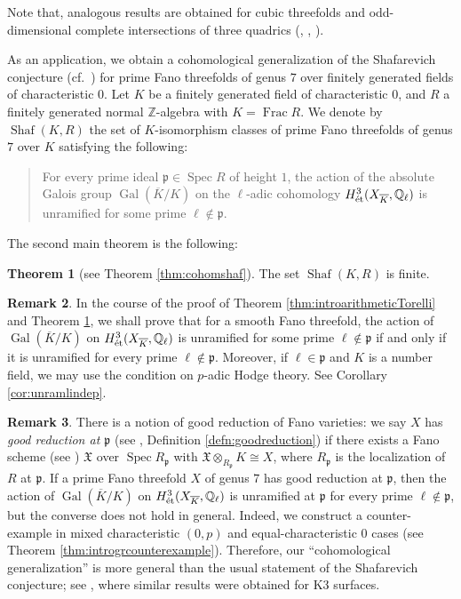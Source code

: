 \documentclass[autodetect-engine, a4paper]{amsart}
\theoremstyle{definition}
\newtheorem{thm}{Theorem}[section]
\newtheorem{rem}[thm]{Remark}
\def\p{{\mathfrak p}}
\def\Q{{\mathbb Q}}
\def\Z{{\mathbb Z}}
\DeclareMathOperator\Gal{\mathrm{Gal}}
\DeclareMathOperator\Frac{\mathrm{Frac}}
\DeclareMathOperator\Spec{\mathrm{Spec}}
\DeclareMathOperator\Shaf{\mathrm{Shaf}}
\def\et{\mathop{\text{\rm \'et}}}
\begin{document}
Note that, analogous results are obtained for cubic threefolds and odd-dimensional complete intersections of three quadrics (\cite{Achter}, \cite{ciurca2024prymvarietiescubicthreefolds}, \cite{Javanpeykar-Loughran:completeintersection}).

As an application, we obtain a cohomological generalization of the Shafarevich conjecture (cf.\ \cite{Takamatsu}) for prime Fano threefolds of genus $7$ over finitely generated fields of characteristic $0$.
Let $K$ be a finitely generated field of characteristic $0$,
and $R$ a finitely generated normal $\Z$-algebra
with $K = \Frac R$.
We denote by $\Shaf(K,R)$ the set of $K$-isomorphism classes of prime Fano threefolds of genus $7$ over $K$
satisfying the following:
\begin{quote}
For every prime ideal $\p \in \Spec R$ of height $1$,
the action of the absolute Galois group
$\Gal(\overline{K}/K)$ on the $\ell$-adic cohomology $H^3_{\et}(X_{\overline{K}}, \Q_{\ell})$
is unramified for some prime $\ell \notin \p$.
\end{quote}

The second main theorem is the following:

\begin{thm}[see Theorem \ref{thm:cohomshaf}]
\label{introMainTheoremshaf}
The set $\Shaf(K,R)$ is finite.
\end{thm}

\begin{rem}
In the course of the proof of Theorem \ref{thm:introarithmeticTorelli} and Theorem \ref{introMainTheoremshaf},
we shall prove that for a smooth Fano threefold,
the action of $\Gal(\overline{K}/K)$ on
$H^3_{\et}(X_{\overline{K}}, \Q_{\ell})$
is unramified for some prime $\ell \notin \p$
if and only if it is unramified for every prime $\ell \notin \p$.
Moreover, if $\ell \in \p$ and $K$ is a number field,
we may use the condition on $p$-adic Hodge theory.
See Corollary \ref{cor:unramlindep}.
\end{rem}

\begin{rem}
\label{rem:introcohgrvsgr}
There is a notion of good reduction of Fano varieties:
we say $X$ has \emph{good reduction at $\p$} (see \cite[Definition 4.3]{Javanpeykar-Loughran:GoodReductionFano},  Definition \ref{defn:goodreduction})
if there exists a Fano scheme (see \cite[Definition 2.1]{Javanpeykar-Loughran:GoodReductionFano})
$\mathfrak{X}$ over $\Spec R_{\p}$
with $\mathfrak{X} \otimes_{R_{\p}} K \cong X$,
where $R_{\p}$ is the localization of $R$ at $\p$.
If a prime Fano threefold $X$ of genus $7$ has good reduction at $\p$,
then the action of $\Gal(\overline{K}/K)$ on
$H^3_{\et}(X_{\overline{K}}, \Q_{\ell})$
is unramified at $\p$
for every prime $\ell \notin \p$,
but the converse does not hold in general.
Indeed, we construct a counter-example in mixed characteristic $(0,p)$ and equal-characteristic $0$ cases (see Theorem \ref{thm:introgrcounterexample}).
Therefore, our ``cohomological generalization''
is more general than the usual statement of the Shafarevich conjecture;
see \cite{Takamatsu}, where similar results were obtained for K3 surfaces.
\end{rem}
\end{document}
